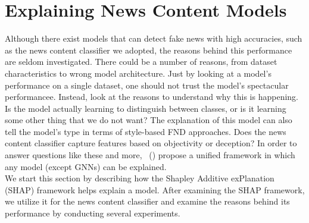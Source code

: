 \section{Explaining News Content Models}
\label{sec:ExplainingNewsContentModels}
Although there exist models that can detect fake news with high accuracies, such as the news content classifier we adopted, the reasons behind this performance are seldom investigated. There could be a number of reasons, from dataset characteristics to wrong model architecture. Just by looking at a model's performance on a single dataset, one should not trust the model's spectacular performancee. Instead, look at the reasons to understand why this is happening. Is the model actually learning to distinguish between classes, or is it learning some other thing that we do not want? The explanation of this model can also tell the model's type in terms of style-based FND approaches. Does the news content classifier capture features based on objectivity or deception? In order to answer questions like these and more,~\citeauthor{AUnifiedApproach_Lundberg} (\citeyear{AUnifiedApproach_Lundberg}) propose a unified framework in which any model (except GNNs) can be explained.\\
We start this section by describing how the Shapley Additive exPlanation (SHAP) framework helps explain a model. After examining the SHAP framework, we utilize it for the news content classifier and examine the reasons behind its performance by conducting several experiments.\\

